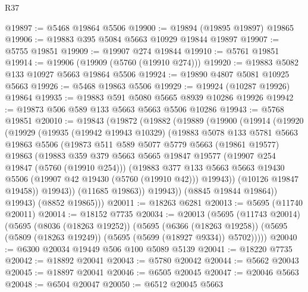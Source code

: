 \begin{lexlean}{R37}
\begin{coremodule}
@19897 := @5468 @19864 @5506
@19900 := @19894 (@19895 @19897) @19865
@19906 := @19883 @395 @5084 @5663 @10929 @19844 @19897
@19907 := @5755 @19851
@19909 := @19907 @274 @19844
@19910 := @5761 @19851
@19914 := @19906 (@19909 (@5760 (@19910 @274)))
@19920 := @19883 @5082 @133 @10927 @5663 @19864 @5506
@19924 := @19890 @4807 @5081 @10925 @5663
@19926 := @5468 @19863 @5506
@19929 := @19924 (@10287 @19926) @19864
@19935 := @19883 @591 @5080 @5665 @8939 @10286 @19926
@19942 := @19873 @506 @589 @133 @5663 @5663 @5506 @10286
@19943 := @5768 @19851
@20010 := @19843
    (@19872
      (@19882
        (@19889
          (@19900
            (@19914
              (@19920
                (@19929
                  (@19935
                    (@19942 @19943 @10329)
                    (@19883
                      @5078
                      @133
                      @5781
                      @5663
                      @19863
                      @5506
                      (@19873
                        @511
                        @589
                        @5077
                        @5779
                        @5663
                        (@19861 @19577)
                        @19863
                        (@19883
                          @359
                          @379
                          @5663
                          @5665
                          @19847
                          @19577
                          (@19907 @254 @19847 (@5760 (@19910 @254)))
                          (@19883
                            @377
                            @133
                            @5663
                            @5663
                            @19430
                            @5506
                            (@19907 @42 @19430 (@5760 (@19910 @42)))
                            @19943))
                        (@10126 @19847 @19458))
                      @19943))
                  (@11685 @19863))
                @19943))
            (@8845 @19844 @19864))
          @19943)
        (@8852 @19865)))
@20011 := @18263 @6281
@20013 := @5695 (@11740 @20011)
@20014 := @18152 @7735
@20034 := @20013
    (@5695
      (@11743 @20014)
      (@5695
        (@8036 (@18263 @19252))
        (@5695
          (@6366 (@18263 @19258))
          (@5695 (@5809 (@18263 @19249)) (@5695 (@5699 (@18927 @9334)) @5702)))))
@20040 := @6300 @20034 @19449 @506 @100 @5089 @5139
@20041 := @18220 @7735
@20042 := @18892 @20041
@20043 := @5780 @20042
@20044 := @5662 @20043
@20045 := @18897 @20041
@20046 := @6505 @20045
@20047 := @20046 @5663
@20048 := @6504 @20047
@20050 := @6512 @20045 @5663

\end{coremodule}
\end{lexlean}
